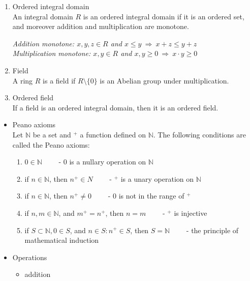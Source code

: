 \documentclass[margin=0px]{article}
\newcommand{\N}{\mathbb{N}}
\begin{document}
\begin{description}
\begin{enumerate}
                  \textit{Zero divisor: $x,y$ are distinct nonzero elements, but $x\cdot y = 0$}
            \item Ordered integral domain \\
                  An integral domain $R$ is an ordered integral domain if it is an ordered set, and moreover addition and multiplication are monotone.

                  \textit{Addition monotone: $x,y,z \in R$ and $x \leq y \ \Rightarrow \ x+z \leq y+z$ \\
                      Multiplication monotone: $x,y \in R$ and $x,y\geq0 \ \Rightarrow \ x\cdot y \geq 0$ }
            \item Field \\
                  A ring $R$ is a field if $R\setminus\{0\}$ is an Abelian group under multiplication.
            \item Ordered field \\
                  If a field is an ordered integral domain, then it is an ordered field.
        \end{enumerate}
        \item[Natural numbers]\hfill
        \begin{itemize}
            \item Peano axioms \\
                  Let $\N$ be a set and $^+$ a function defined on $\N$. The following conditions are called the Peano axioms:
                  \begin{enumerate}
                      \item $0 \in \N \qquad$ - $0$ is a nullary operation on $\N$
                      \item if $n \in \N$, then $n^+ \in N \qquad$ - $^+$ is a unary operation on $\N$
                      \item if $n \in \N$, then $n^+ \neq 0 \qquad $ - $0$ is not in the range of $^+$
                      \item if $n,m \in \N$, and $m^+ = n^+$, then $n = m \qquad $ - $^+$ is injective
                      \item if $S \subset \N, 0 \in S$, and $ n \in S : n^+\in S$, then $S = \N \qquad $ - the principle of mathematical induction
                  \end{enumerate}
            \item Operations
                  \begin{itemize}
                      \item addition \\

\end{itemize}
\end{itemize}
\end{description}
\end{document}
